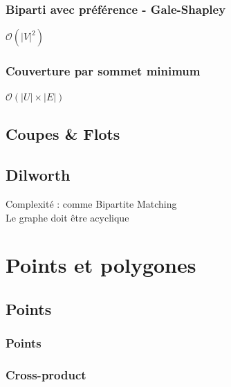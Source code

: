\documentclass[8pt]{article}
\begin{document}
            \subsubsection{Biparti avec préférence - Gale-Shapley}
            $\mathcal{O}(\lvert V \rvert ^2)$
            {\scriptsize}
            \subsubsection{Couverture par sommet minimum}
            $\mathcal{O}(\lvert U \rvert  \times \lvert E \rvert)$
            {\scriptsize}
        \subsection{Coupes \& Flots}
            \subsection{Dilworth}
            Complexité : comme Bipartite Matching\\
            Le graphe doit être acyclique
            {\scriptsize}
    \section{Points et polygones}
        \subsection{Points}
            \subsubsection{Points}
            {\scriptsize}
            \subsubsection{Cross-product}
            {\scriptsize}
\end{document}
